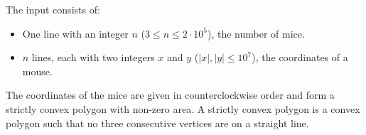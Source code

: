 
\vspace{-1mm}
  The input consists of:
  \begin{itemize}
    \item One line with an integer $n$ ($3 \leq n \leq 2\cdot 10^5$), the number of mice.
    \item $n$ lines, each with two integers $x$ and $y$ ($|x|, |y| \leq 10^7$), the coordinates of a mouse.
  \end{itemize}
  The coordinates of the mice are given in counterclockwise order and form a strictly convex polygon with non-zero area.
  A strictly convex polygon is a convex polygon such that no three consecutive vertices are on a straight line.
